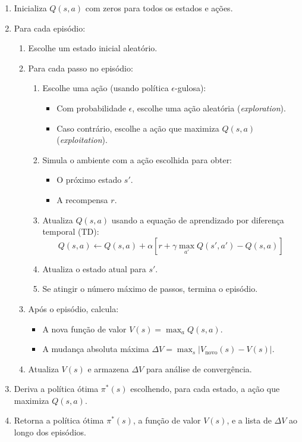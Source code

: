 \begin{enumerate}
    \item Inicializa \( Q(s, a) \) com zeros para todos os estados e ações.
    \item Para cada episódio:
    \begin{enumerate}
        \item Escolhe um estado inicial aleatório.
        \item Para cada passo no episódio:
        \begin{enumerate}
            \item Escolhe uma ação (usando política \( \epsilon \)-gulosa):
            \begin{itemize}
                \item Com probabilidade \( \epsilon \), escolhe uma ação aleatória (\textit{exploration}).
                \item Caso contrário, escolhe a ação que maximiza \( Q(s, a) \) (\textit{exploitation}).
            \end{itemize}
            \item Simula o ambiente com a ação escolhida para obter:
            \begin{itemize}
                \item O próximo estado \( s' \).
                \item A recompensa \( r \).
            \end{itemize}
            \item Atualiza \( Q(s, a) \) usando a equação de aprendizado por diferença temporal (TD):
            \[
            Q(s, a) \leftarrow Q(s, a) + \alpha \left[ r + \gamma \max_{a'} Q(s', a') - Q(s, a) \right]
            \]
            \item Atualiza o estado atual para \( s' \).
            \item Se atingir o número máximo de passos, termina o episódio.
        \end{enumerate}
        \item Após o episódio, calcula:
        \begin{itemize}
            \item A nova função de valor \( V(s) = \max_a Q(s, a) \).
            \item A mudança absoluta máxima \( \Delta V = \max_s |V_{\text{novo}}(s) - V(s)| \).
        \end{itemize}
        \item Atualiza \( V(s) \) e armazena \( \Delta V \) para análise de convergência.
    \end{enumerate}
    \item Deriva a política ótima \( \pi^*(s) \) escolhendo, para cada estado, a ação que maximiza \( Q(s, a) \).
    \item Retorna a política ótima \( \pi^*(s) \), a função de valor \( V(s) \), e a lista de \( \Delta V \) ao longo dos episódios.
\end{enumerate}

